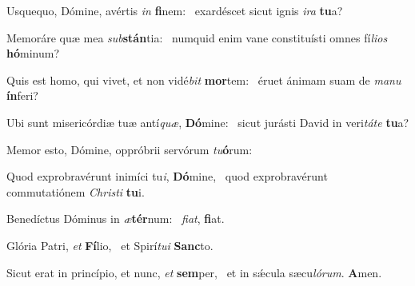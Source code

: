 \item Usquequo, Dómine, avértis \textit{in} \textbf{fi}nem:~\psstar{} exardéscet sicut ignis \textit{i}\textit{ra} \textbf{tu}a?
\item Memoráre quæ mea \textit{sub}\textbf{stán}tia:~\psstar{} numquid enim vane constituísti omnes fí\textit{li}\textit{os} \textbf{hó}minum?
\item Quis est homo, qui vivet, et non vidé\textit{bit} \textbf{mor}tem:~\psstar{} éruet ánimam suam de \textit{ma}\textit{nu} \textbf{ín}feri?
\item Ubi sunt misericórdiæ tuæ antí\textit{quæ}, \textbf{Dó}mine:~\psstar{} sicut jurásti David in veri\textit{tá}\textit{te} \textbf{tu}a?
\item Memor esto, Dómine, oppróbrii servórum \textit{tu}\textbf{ó}rum:~\psstar{} 
\item Quod exprobravérunt inimíci tu\textit{i}, \textbf{Dó}mine,~\psstar{} quod exprobravérunt commutatiónem \textit{Chris}\textit{ti} \textbf{tu}i.
\item Benedíctus Dóminus in \textit{æ}\textbf{tér}num:~\psstar{} \textit{fi}\textit{at}, \textbf{fi}at.
\item Glória Patri, \textit{et} \textbf{Fí}lio,~\psstar{} et Spirí\textit{tu}\textit{i} \textbf{Sanc}to.
\item Sicut erat in princípio, et nunc, \textit{et} \textbf{sem}per,~\psstar{} et in sǽcula sæcu\textit{ló}\textit{rum}. \textbf{A}men.
